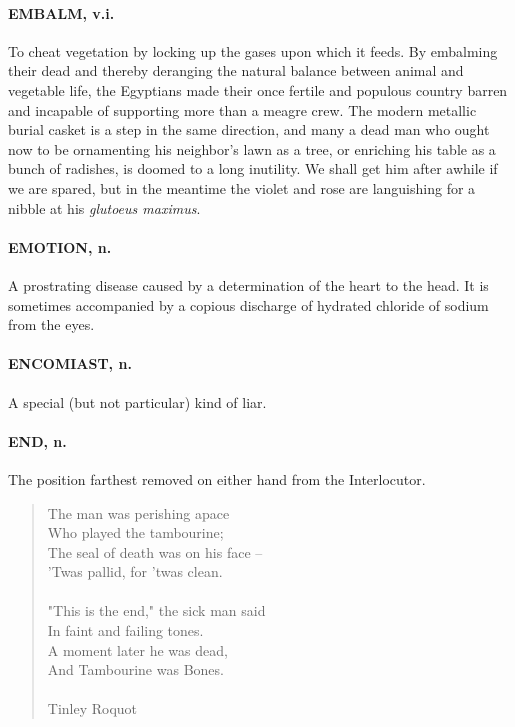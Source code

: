 \documentclass[11pt]{article}
\begin{document}
\paragraph{EMBALM, v.i.}  To cheat vegetation by locking up the gases upon which
it feeds.  By embalming their dead and thereby deranging the natural
balance between animal and vegetable life, the Egyptians made their
once fertile and populous country barren and incapable of supporting
more than a meagre crew.  The modern metallic burial casket is a step
in the same direction, and many a dead man who ought now to be
ornamenting his neighbor's lawn as a tree, or enriching his table as a
bunch of radishes, is doomed to a long inutility.  We shall get him
after awhile if we are spared, but in the meantime the violet and rose
are languishing for a nibble at his {\em glutoeus maximus}.

\paragraph{EMOTION, n.}  A prostrating disease caused by a determination of the
heart to the head.  It is sometimes accompanied by a copious discharge
of hydrated chloride of sodium from the eyes.

\paragraph{ENCOMIAST, n.}  A special (but not particular) kind of liar.

\paragraph{END, n.}  The position farthest removed on either hand from the
Interlocutor.

\begin{quote}   The man was perishing apace \\
      Who played the tambourine; \\
  The seal of death was on his face -- \\
      'Twas pallid, for 'twas clean. \\
 \\
  "This is the end," the sick man said \\
      In faint and failing tones. \\
  A moment later he was dead, \\
      And Tambourine was Bones. \\
 \\
Tinley Roquot \end{quote}
\end{document}
